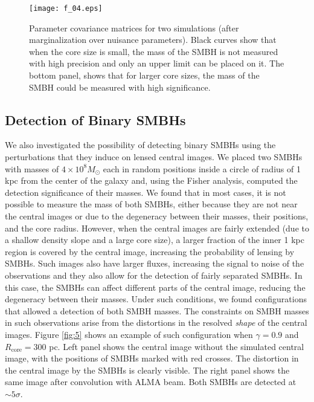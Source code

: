 \documentclass[chicago]{emulateapj}
\begin{document}
\begin{figure}
\begin{center}
\centering
\texttt{[image: f\_04.eps]}
\centering
\end{center}
\caption{ Parameter covariance matrices for two simulations (after marginalization over nuisance parameters). Black curves show that when the core size is small, the mass of the SMBH is not measured with high precision and only an upper limit can be placed on it. The bottom panel, shows that for larger core sizes, the mass of the SMBH could be measured with high significance. 
\label{fig:4}}
\end{figure}


\subsection{Detection of Binary SMBHs}
We also investigated the possibility of detecting binary SMBHs using the perturbations that they induce on lensed central images. 
We placed two SMBHs with masses of $4\times10^8 M_{\odot}$ each in random positions inside a circle of radius of 1 kpc from the center of the galaxy and, using the Fisher analysis, computed the detection significance of their masses. 
We found that in most cases, it is not possible to measure the mass of both SMBHs, either because they are not near the central images or due to the degeneracy between their masses, their positions, and the core radius. %
However, when the central images are fairly extended (due to a shallow density slope and a large core size), a larger fraction of the inner 1 kpc region is covered by the central image, increasing the probability of lensing by SMBHs. Such images also have larger fluxes, increasing the signal to noise of the observations and they also allow for the detection of fairly separated SMBHs. In this case, the SMBHs can affect different parts of the central image, reducing the degeneracy between their masses.
Under such conditions, we found configurations that allowed a detection of both SMBH masses. The constraints on SMBH masses in such observations arise from the distortions in the resolved \emph{shape} of the central images. Figure \ref{fig:5} shows an example of such configuration when $\gamma = 0.9$ and $R_{\mathrm{core}}=300$ pc. Left panel shows the central image without the simulated central image, with the positions of SMBHs marked with red crosses. The distortion in the central image by the SMBHs is clearly visible. The right panel shows the same image after convolution with ALMA beam. Both SMBHs are detected at $\sim5\sigma$.
\end{document}
